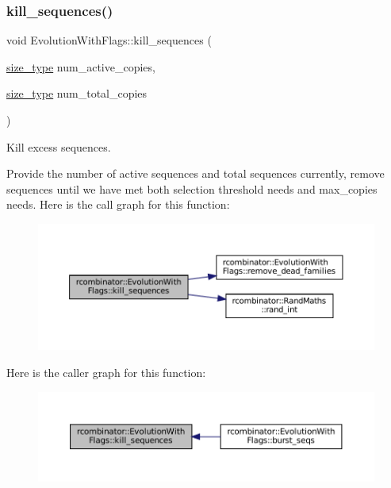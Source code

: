 \subsubsection{\texorpdfstring{kill\+\_\+sequences()}{kill\_sequences()}}
{\footnotesize\ttfamily void Evolution\+With\+Flags\+::kill\+\_\+sequences (\begin{DoxyParamCaption}\item[{\mbox{\hyperlink{constants_8h_abcd18a5521fc90ff6e7b00e4fee98397}{size\+\_\+type}}}]{num\+\_\+active\+\_\+copies,  }\item[{\mbox{\hyperlink{constants_8h_abcd18a5521fc90ff6e7b00e4fee98397}{size\+\_\+type}}}]{num\+\_\+total\+\_\+copies }\end{DoxyParamCaption})\hspace{0.3cm}{\ttfamily [protected]}}



Kill excess sequences. 

Provide the number of active sequences and total sequences currently, remove sequences until we have met both selection threshold needs and max\+\_\+copies needs. Here is the call graph for this function\+:
\nopagebreak
\begin{figure}[H]
\begin{center}
\leavevmode
\includegraphics[width=350pt]{classrcombinator_1_1EvolutionWithFlags_ae5a9e278233d2ea42bdef4df66d4b5b9_cgraph}
\end{center}
\end{figure}
Here is the caller graph for this function\+:
\nopagebreak
\begin{figure}[H]
\begin{center}
\leavevmode
\includegraphics[width=350pt]{classrcombinator_1_1EvolutionWithFlags_ae5a9e278233d2ea42bdef4df66d4b5b9_icgraph}
\end{center}
\end{figure}
\mbox{\label{classrcombinator_1_1EvolutionWithFlags_ad94cabcb6a894d503c3d84c6022a1438}} 
